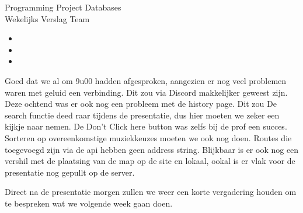 \documentclass{article}
\newcounter{team}
\begin{document}

	\begin{Minutes}{Programming Project Databases \\ Wekelijks Verslag Team }
		\missingNoExcuse{/}
		\missingExcused{/}

		\maketitle


			        \begin{itemize}
			            \item {}
			            \item {}
			            \item {}
			        \end{itemize}

		            Goed dat we al om 9u00 hadden afgesproken, aangezien er nog veel problemen waren met geluid een verbinding. Dit zou via Discord makkelijker geweest zijn. Deze ochtend was er ook nog een probleem met de history page. Dit zou
		            De search functie deed raar tijdens de presentatie, dus hier moeten we zeker een kijkje naar nemen.
		            De Don't Click here button was zelfs bij de prof een succes.
		            Sorteren op overeenkomstige muziekkeuzes moeten we ook nog doen.
		            Routes die toegevoegd zijn via de api hebben geen address string.
		            Blijkbaar is er ook nog een vershil met de plaatsing van de map op de site en lokaal, ookal is er vlak voor de presentatie nog gepullt op de server.



 		    Direct na de presentatie morgen zullen we weer een korte vergadering houden om te bespreken wat we volgende week gaan doen.


\end{Minutes}
\end{document}

